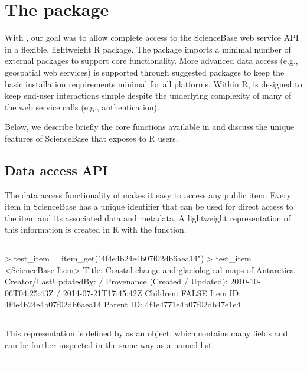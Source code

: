 
\section{The  package}

With , our goal was to allow complete
access to the ScienceBase web service API in a flexible, lightweight
R package. The package imports a minimal number of external packages
to support core functionality. More advanced data access (e.g., geospatial
web services) is supported through suggested packages to keep the basic
installation requirements minimal for all platforms. Within R, 
is designed to keep end-user interactions simple despite the underlying 
complexity of many of the web service calls (e.g., authentication).

Below, we describe briefly the core functions available in 
and discuss the unique features of ScienceBase that 
exposes to R users.


\subsection{Data access API}
The data access functionality of  makes it easy to
access any public item. Every item in ScienceBase has a unique identifier
that can be used for direct access to the item and its associated data and
metadata. A lightweight representation of this information is created in R
with the  function.

\noindent\rule{\textwidth}{0.4pt}
\begin{example}
> test_item = item_get("4f4e4b24e4b07f02db6aea14")
> test_item
<ScienceBase Item>
  Title: Coastal-change and glaciological maps of Antarctica
  Creator/LastUpdatedBy:      /
  Provenance (Created / Updated):  2010-10-06T04:25:43Z / 2014-07-21T17:45:42Z
  Children: FALSE
  Item ID: 4f4e4b24e4b07f02db6aea14
  Parent ID: 4f4e4771e4b07f02db47e1e4
\end{example}
\noindent\rule{\textwidth}{0.4pt}

This representation is defined by  as an  object,
which contains many fields and can be further inspected in the same
way as a named list.

\noindent\rule{\textwidth}{0.4pt}
\noindent\rule{\textwidth}{0.4pt}

